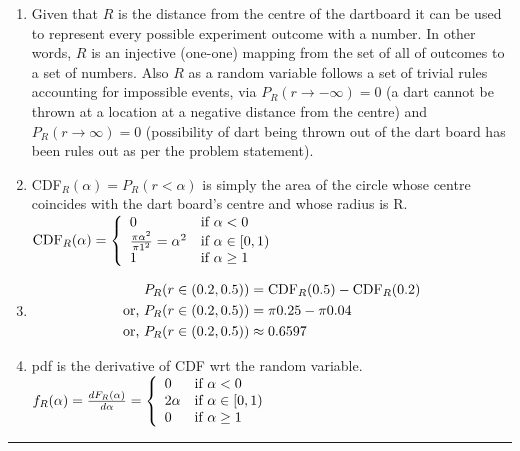 \begin{enumerate}[7a.]
	\item Given that $R$ is the distance from the centre of the dartboard it can be used to represent every possible experiment outcome with a number. In other words, $R$ is an injective (one-one) mapping from the set of all of outcomes to a set of numbers. Also $R$ as a random variable follows a set of trivial rules accounting for impossible events, via $P_R(r\rightarrow-\infty) = 0$ (a dart cannot be thrown at a location at a negative distance from the centre) and $P_R(r\rightarrow\infty) = 0$ (possibility of dart being thrown out of the dart board has been rules out as per the problem statement).
	
	\item CDF$_R(\alpha) = P_R(r<\alpha)$ is simply the area of the circle whose centre coincides with the dart board's centre and whose radius is R.\\[5pt]
	$\text{CDF}_R(\alpha) = \threepartdef{0}{\alpha < 0}{\frac{\pi \alpha^2}{\pi 1^2} = \alpha^2}{\alpha \in [0,1)}{1}{\alpha \geq 1}$
	
	\item 
		\begin{align}
			P_R(r \in (0.2, 0.5)) &= \text{CDF}_R(0.5) - \text{CDF}_R(0.2) \nonumber\\
			\text{or, } P_R(r \in (0.2, 0.5)) &= \pi0.25 - \pi0.04 \nonumber\\
			\text{or, } P_R(r \in (0.2, 0.5)) &\approx  0.6597 \nonumber
		\end{align}
	
	\item pdf is the derivative of CDF wrt the random variable.\\
	$f_R(\alpha) = \frac{dF_R(\alpha)}{d\alpha} = \threepartdef{0}{\alpha < 0}{2\alpha}{\alpha \in [0,1)}{0}{\alpha \geq 1}$
\end{enumerate}	

\noindent\rule{\textwidth}{1pt}
